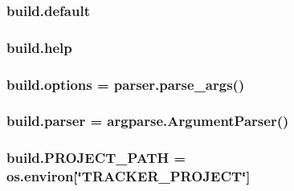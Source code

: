 \subsubsection[{\texorpdfstring{default}{default}}]{\setlength{\rightskip}{0pt plus 5cm}build.\+default}\hypertarget{namespacebuild_a66bfdb2cf96ab264fd9961f440b210f7}{}\label{namespacebuild_a66bfdb2cf96ab264fd9961f440b210f7}
\subsubsection[{\texorpdfstring{help}{help}}]{\setlength{\rightskip}{0pt plus 5cm}build.\+help}\hypertarget{namespacebuild_a37faf92853bd92811229cdc279a452ee}{}\label{namespacebuild_a37faf92853bd92811229cdc279a452ee}
\subsubsection[{\texorpdfstring{options}{options}}]{\setlength{\rightskip}{0pt plus 5cm}build.\+options = parser.\+parse\+\_\+args()}\hypertarget{namespacebuild_a2c4663bf57d7da0c03ea8c7557117ae6}{}\label{namespacebuild_a2c4663bf57d7da0c03ea8c7557117ae6}
\subsubsection[{\texorpdfstring{parser}{parser}}]{\setlength{\rightskip}{0pt plus 5cm}build.\+parser = argparse.\+Argument\+Parser()}\hypertarget{namespacebuild_a8217a1ff1b7dcad2732a5e359cfbfb31}{}\label{namespacebuild_a8217a1ff1b7dcad2732a5e359cfbfb31}
\subsubsection[{\texorpdfstring{P\+R\+O\+J\+E\+C\+T\+\_\+\+P\+A\+TH}{PROJECT_PATH}}]{\setlength{\rightskip}{0pt plus 5cm}build.\+P\+R\+O\+J\+E\+C\+T\+\_\+\+P\+A\+TH = os.\+environ\mbox{[}\char`\"{}T\+R\+A\+C\+K\+E\+R\+\_\+\+P\+R\+O\+J\+E\+CT\char`\"{}\mbox{]}}\hypertarget{namespacebuild_a014c5008d4384fd846c971a8856306dc}{}\label{namespacebuild_a014c5008d4384fd846c971a8856306dc}
